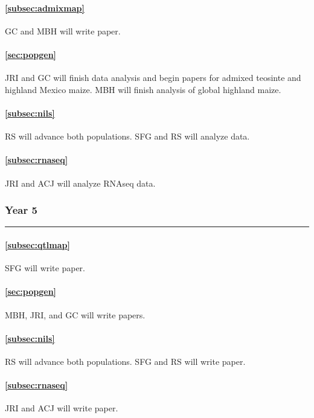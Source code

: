 \paragraph{  \bf  \ref{subsec:admixmap}} GC and MBH will write paper. 
\paragraph{  \bf  \ref{sec:popgen}} JRI and GC will finish data analysis and begin papers for admixed teosinte and highland Mexico maize. MBH will finish analysis of global highland maize. 
\paragraph{ \bf \ref{subsec:nils}} RS will advance both populations. SFG and RS will analyze data.
\paragraph{ \bf   \ref{subsec:rnaseq}} JRI and ACJ will analyze RNAseq data.

\subsubsection*{Year 5} \hrule \vspace{0.1cm}

\paragraph{  \bf \ref{subsec:qtlmap}} SFG will write paper.
\paragraph{  \bf  \ref{sec:popgen}} MBH, JRI, and GC will write papers.
\paragraph{ \bf \ref{subsec:nils}} RS will advance both populations. SFG and RS will write paper.
\paragraph{ \bf   \ref{subsec:rnaseq}} JRI and ACJ will write paper.

